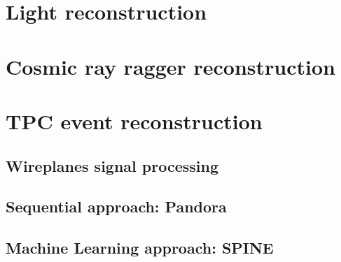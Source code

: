 



\section{Light reconstruction}

\section{Cosmic ray ragger reconstruction}

\section{TPC event reconstruction}

\subsection{Wireplanes signal processing}

\subsection{Sequential approach: Pandora}

\subsection{Machine Learning approach: SPINE}

